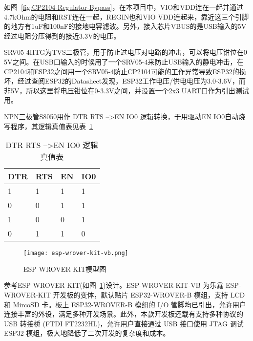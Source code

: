 如图~\ref{fig:CP2104-Regulator-Bypass}，在本项目中，VIO和VDD连在一起并通过4.7kOhm的电阻和RST连在一起，REGIN也和VIO VDD连起来，靠近这三个引脚的地方有1uF和100nF的接地电容滤波。另外，接入芯片VBUS的是USB输入的5V经过电阻分压得到的接近3.3V的电压。

SRV05-4HTG为TVS二极管，用于防止过电压对电路的冲击，可以将电压钳位在0-5V之间。在USB口输入的时候用了一个SRV05-4来防止USB输入的静电冲击，在CP2104和ESP32之间用一个SRV05-4防止CP2104可能的工作异常导致ESP32的损坏，经过查阅ESP32的Datasheet发现，ESP32工作电压/供电电压为3.0-3.6V，而非5V，所以这里将电压钳位在0-3.3V之间，并设置一个2x3 UART口作为引出测试用。

NPN三极管S8050用作 DTR RTS --\textgreater EN IO0 逻辑转换，于用驱动EN IO0自动烧写程序，其逻辑真值表见表~\ref{tab:LogicTab}

\begin{table}[]
    \centering
    \begin{tabular}{@{}llll@{}}
    \toprule
    DTR & RTS & EN & IO0 \\ \midrule
    1   & 1   & 1  & 1   \\
    0   & 0   & 1  & 1   \\
    1   & 0   & 0  & 1   \\
    0   & 1   & 1  & 0   \\ \bottomrule
    \end{tabular}
    \caption{DTR RTS --\textgreater EN IO0 逻辑真值表}
    \label{tab:LogicTab}
\end{table}


\begin{figure}[htbp]
    \centering
    \texttt{[image: esp-wrover-kit-vb.png]}
    \caption{ESP WROVER KIT模型图}
    \label{fig:ESP32-WROVER}
\end{figure}

参考ESP WROVER KIT(如图~\ref{fig:ESP32-WROVER})设计。ESP-WROVER-KIT-VB 为乐鑫 ESP-WROVER-KIT 开发板的变体，默认贴片 ESP32-WROVER-B 模组，支持 LCD 和 MircoSD 卡。板上 ESP32-WROVER-B 模组的 I/O 管脚均已引出，允许用户连接丰富的外设，满足多种开发场景。此外，本款开发板还载有支持多种协议的 USB 转接桥 (FTDI FT2232HL)，允许用户直接通过 USB 接口使用 JTAG 调试 ESP32 模组，极大地降低了二次开发的复杂度和成本。

